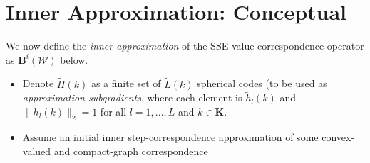 \documentclass[a4paper,10pt,english]{sphinxmanual}
\begin{document}
\section{Inner Approximation: Conceptual}
\label{payoff_compute:inner-approximation-conceptual}
We now define the \emph{inner approximation} of the SSE value correspondence operator as $\mathbf{B}^i(\mathcal{W})$ below.
\begin{itemize}
\item {} 
Denote $\tilde{H}(k)$ as a finite set of $\tilde{L}(k)$ spherical codes (to be used as \emph{approximation subgradients}, where each
element is $\tilde{h}_l (k)$ and $\| \tilde{h}_l (k) \|_2 = 1$ for all
$l = 1,...,\tilde{L}$ and $k \in \mathbf{K}$.

\item {} 
Assume an initial inner step-correspondence approximation of some
convex-valued and compact-graph correspondence

\end{itemize}
\end{document}
